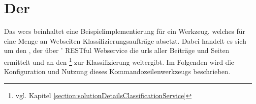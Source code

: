 \section{Der {\wordpressCrawler}}
    \label{section:solutionDetailsCrawler}
    Das \gls{wccs} beinhaltet eine Beispielimplementierung für ein Werkzeug,
    welches für eine Menge an Webseiten Klassifizierungsaufträge absetzt.
    Dabei handelt es sich um den {\wordpressCrawler},
    der über {\wordpress}' RESTful Webservice \cite{wordpress:RestAPI}
    die \glspl{url} aller Beiträge und Seiten ermittelt
    und an den {\classificationService}\footnote{vgl. Kapitel \ref{section:solutionDetailsClassificationService}}
    zur Klassifizierung weitergibt.
    Im Folgenden wird die Konfiguration und Nutzung dieses Kommandozeilenwerkzeugs beschrieben.

    
    